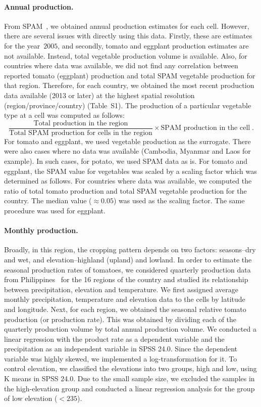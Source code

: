 \documentclass[10pt]{article}
\theoremstyle{definition}
\begin{document}
\paragraph{Annual production.} From SPAM~\cite{spam}, we obtained annual
production estimates for each cell.  However, there are several issues with
directly using this data. Firstly, these are estimates for the year~$2005$,
and secondly, tomato and eggplant production estimates are not available.
Instead, total vegetable production volume is available. Also, for
countries where data was available, we did not find any correlation between
reported tomato (eggplant) production and total SPAM vegetable production
for that region. Therefore, for each country, we obtained the most recent
production data available (2013 or later) at the highest spatial resolution
(region/province/country) (Table~S1). The production of a particular
vegetable type at a cell was computed as follows:
\[\frac{\text{Total production in the region}}{\text{Total SPAM production
    for cells in the region}}\times \text{SPAM production in the cell} \;.\]
For tomato and eggplant, we used vegetable production as the surrogate.
There were also cases where no data was available (Cambodia, Myanmar and
Laos for example). In such cases, for potato, we used SPAM data as is. For
tomato and eggplant, the SPAM value for vegetables was scaled by a scaling
factor which was determined as follows. For countries where data was
available, we computed the ratio of total tomato production and total SPAM
vegetable production for the country. The median value ($\approx0.05$) was
used as the scaling factor. The same procedure was used for eggplant. 

\paragraph{Monthly production.} Broadly, in this region, the cropping pattern depends on two factors:
seasons--dry and wet, and elevation--highland (upland) and lowland. In order to estimate the seasonal production rates of tomatoes, we
considered quarterly production data from Philippines~\cite{psa2017} for the 16
regions of the country and studied its relationship between precipitation,
elevation and temperature. We first assigned average monthly precipitation,
temperature and elevation data to the cells by latitude and longitude.
Next, for each region, we obtained the seasonal relative tomato production
(or production rate). This was obtained by dividing each of the quarterly
production volume by total annual production volume. We conducted a linear
regression with the product rate as a dependent variable and the
precipitation as an independent variable in SPSS 24.0. Since the dependent
variable was highly skewed, we implemented a log-transformation for it. To
control elevation, we classified the elevations into two groups, high and
low, using K means in SPSS 24.0. Due to the small sample size, we excluded
the samples in the high-elevation group and conducted a linear regression
analysis for the group of low elevation ($< 235$). 
\end{document}
